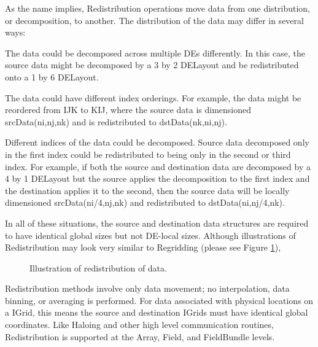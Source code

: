 

As the name implies, Redistribution operations move data from one distribution,
or decomposition, to another.  The distribution of the data may differ in several 
ways:
 \begin{description}

  \item The data could be decomposed across multiple DEs differently.  In this
        case, the source data might be decomposed by a 3 by 2 DELayout and be
        redistributed onto a 1 by 6 DELayout.

  \item The data could have different index orderings.  For example, the data
        might be reordered from IJK to KIJ, where the source data is
        dimensioned srcData(ni,nj,nk) and is redistributed to dstData(nk,ni,nj).

  \item Different indices of the data could be decomposed.  Source data
        decomposed only in the first index could be redistributed to being
        only in the second or third index.  For example, if both the source
        and destination data are decomposed by a 4 by 1 DELayout but the source
        applies the decomposition to the first index and the destination
        applies it to the second, then the source data will be locally
        dimensioned srcData(ni/4,nj,nk) and redistributed to dstData(ni,nj/4,nk).

 \end{description}

In all of these situations, the source and destination data structures are
required to have identical global sizes but not DE-local sizes.  Although
illustrations of Redistribution may look very similar to Regridding (please
see Figure \ref{fig:Redist}),

\begin{center}
\begin{figure}
\label{fig:Redist}
\caption{Illustration of redistribution of data. }
\end{figure}
\end{center}

Redistribution methods involve only data movement; no interpolation, data
binning, or averaging is performed.  For data associated with physical locations
on a IGrid, this means the source and destination IGrids must have identical
global coordinates.  Like Haloing and other high level communication routines,
Redistribution is supported at the Array, Field, and FieldBundle levels. 

